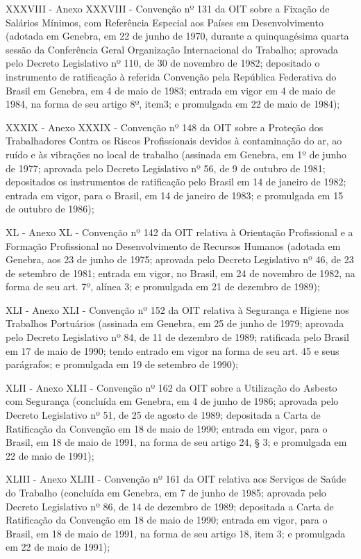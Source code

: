 \documentclass[
]{book}
\begin{document}
XXXVIII - Anexo XXXVIII - Convenção nº 131 da OIT sobre a Fixação de Salários Mínimos, com Referência Especial aos Países em Desenvolvimento (adotada em Genebra, em 22 de junho de 1970, durante a quinquagésima quarta sessão da Conferência Geral Organização Internacional do Trabalho; aprovada pelo Decreto Legislativo nº 110, de 30 de novembro de 1982; depositado o instrumento de ratificação à referida Convenção pela República Federativa do Brasil em Genebra, em 4 de maio de 1983; entrada em vigor em 4 de maio de 1984, na forma de seu artigo 8º, item3; e promulgada em 22 de maio de 1984);

XXXIX - Anexo XXXIX - Convenção nº 148 da OIT sobre a Proteção dos Trabalhadores Contra os Riscos Profissionais devidos à contaminação do ar, ao ruído e às vibrações no local de trabalho (assinada em Genebra, em 1º de junho de 1977; aprovada pelo Decreto Legislativo nº 56, de 9 de outubro de 1981; depositados os instrumentos de ratificação pelo Brasil em 14 de janeiro de 1982; entrada em vigor, para o Brasil, em 14 de janeiro de 1983; e promulgada em 15 de outubro de 1986);

XL - Anexo XL - Convenção nº 142 da OIT relativa à Orientação Profissional e a Formação Profissional no Desenvolvimento de Recursos Humanos (adotada em Genebra, aos 23 de junho de 1975; aprovada pelo Decreto Legislativo nº 46, de 23 de setembro de 1981; entrada em vigor, no Brasil, em 24 de novembro de 1982, na forma de seu art. 7º, alínea 3; e promulgada em 21 de dezembro de 1989);

XLI - Anexo XLI - Convenção nº 152 da OIT relativa à Segurança e Higiene nos Trabalhos Portuários (assinada em Genebra, em 25 de junho de 1979; aprovada pelo Decreto Legislativo nº 84, de 11 de dezembro de 1989; ratificada pelo Brasil em 17 de maio de 1990; tendo entrado em vigor na forma de seu art. 45 e seus parágrafos; e promulgada em 19 de setembro de 1990);

XLII - Anexo XLII - Convenção nº 162 da OIT sobre a Utilização do Asbesto com Segurança (concluída em Genebra, em 4 de junho de 1986; aprovada pelo Decreto Legislativo nº 51, de 25 de agosto de 1989; depositada a Carta de Ratificação da Convenção em 18 de maio de 1990; entrada em vigor, para o Brasil, em 18 de maio de 1991, na forma de seu artigo 24, § 3; e promulgada em 22 de maio de 1991);

XLIII - Anexo XLIII - Convenção nº 161 da OIT relativa aos Serviços de Saúde do Trabalho (concluída em Genebra, em 7 de junho de 1985; aprovada pelo Decreto Legislativo nº 86, de 14 de dezembro de 1989; depositada a Carta de Ratificação da Convenção em 18 de maio de 1990; entrada em vigor, para o Brasil, em 18 de maio de 1991, na forma de seu artigo 18, item 3; e promulgada em 22 de maio de 1991);
\end{document}
